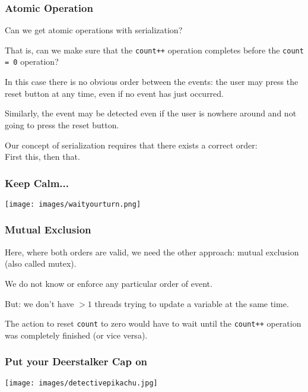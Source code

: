 \begin{frame}
	\frametitle{Atomic Operation}

	Can we get atomic operations with serialization?

	That is, can we make sure that the \texttt{count++} operation completes before the \texttt{count = 0} operation?

	In this case there is no obvious order between the events: the user may press the reset button at any time, even if no event has just occurred.

	Similarly, the event may be detected even if the user is nowhere around and not going to press the reset button.

	Our concept of serialization requires that there exists a correct order:\\
	\quad First this, then that.


\end{frame}


\begin{frame}
	\frametitle{Keep Calm...}

	\begin{center}
		\texttt{[image: images/waityourturn.png]}
	\end{center}

\end{frame}


\begin{frame}
	\frametitle{Mutual Exclusion}

	Here, where both orders are valid, we need the other approach: mutual exclusion (also called \alert{mutex}).

	We do not know or enforce any particular order of event.

	But: we don't have $>1$ threads trying to update a variable at the same time.

	The action to reset \texttt{count} to zero would have to wait until the \texttt{count++} operation was completely finished (or vice versa).


\end{frame}


\begin{frame}
\frametitle{Put your Deerstalker Cap on}

\begin{center}
	\texttt{[image: images/detectivepikachu.jpg]}
\end{center}

\end{frame}


